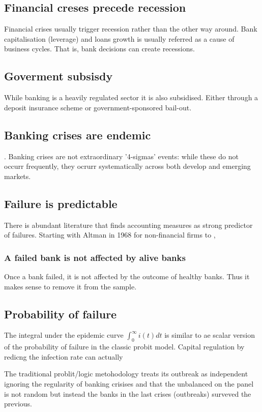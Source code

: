 \documentclass[11pt,final]{article}%
\begin{document}
\subsection{Financial creses precede recession}
Financial crises usually trigger recession rather than the other way around. Bank capitalisation (leverage) and loans growth is usually referred as  a cause of business cycles. That is, bank decisions can create recessions.

\subsection{Goverment subsisdy}
While banking is a heavily regulated sector it is also subsidised. Either through a deposit insurance scheme or government-sponsored bail-out.

\subsection{Banking crises are endemic}.
Banking crises are not extraordinary '4-sigmas' events: while these do not occurr frequently, they ocrurr systematically across both develop and emerging markets.

\subsection{Failure is predictable}
There is abundant literature that finds accounting measures as strong predictor of failures. Starting with Altman in 1968 for non-financial firms to , 

\subsubsection{A failed bank is not affected by alive banks}
Once a bank failed, it is not affected by the outcome of healthy banks. Thus it makes sense to remove it from the sample.


\subsection{Probability of failure}
The integral under the epidemic curve $\int_{0}^{\infty} i(t) dt $ is similar to ae scalar version of the probability of failure in the classic probit model. 
Capital regulation by redicng the infection rate can actually 

The traditional problit/logic metohodology treats its outbreak as independent ignoring the regularity of banking crisises and that the unbalanced on the panel is not random but instead the banks in the last crises (outbreaks) surveved the previous. 
\end{document}
